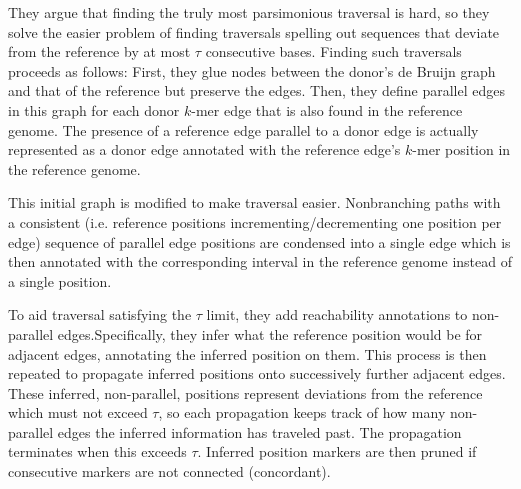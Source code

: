 \documentclass[doctor]{thesis}
\begin{document}
They argue that finding the truly most parsimonious traversal is hard, so they solve the easier problem of finding traversals spelling out sequences that deviate from the reference by at most $\tau$ consecutive bases.
Finding such traversals proceeds as follows: First, they glue nodes between the donor's de Bruijn graph and that of the reference but preserve the edges.
Then, they define parallel edges in this graph for each donor $k$-mer edge that is also found in the reference genome.
The presence of a reference edge parallel to a donor edge is actually represented as a donor edge annotated with the reference edge's $k$-mer position in the reference genome.  

This initial graph is modified to make traversal easier.
Nonbranching paths with a consistent (i.e. reference positions incrementing/decrementing one position per edge) sequence of parallel edge positions are condensed into a single edge which is then annotated with the corresponding interval in the reference genome instead of a single position.  

To aid traversal satisfying the $\tau$ limit, they add reachability annotations to non-parallel edges.Specifically, they infer what the reference position would be for adjacent edges, annotating the inferred position on them.
This process is then repeated to propagate inferred positions onto successively further adjacent edges.
These inferred, non-parallel, positions represent deviations from the reference which must not exceed $\tau$, so each propagation keeps track of how many non-parallel edges the inferred information has traveled past.
The propagation terminates when this exceeds $\tau$.
Inferred position markers are then pruned if consecutive markers are not connected (concordant).



\end{document}
